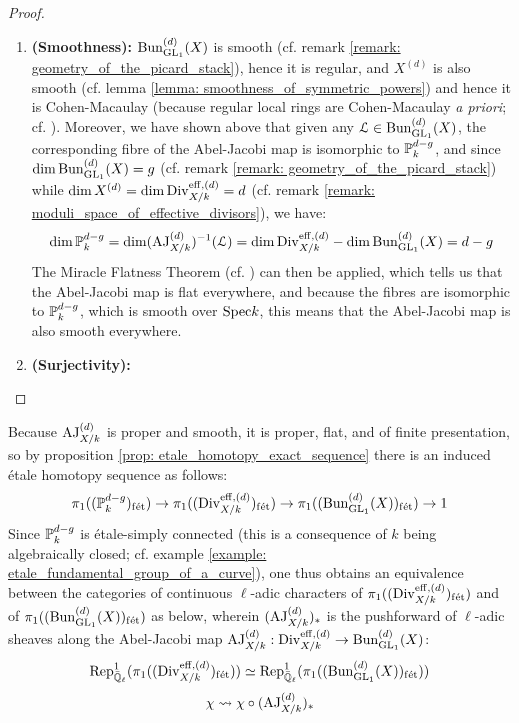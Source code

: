 \begin{proof}
\begin{enumerate}
                        \item \textbf{(Smoothness):} $\Bun_{\GL_1}^{(d)}(X)$ is smooth (cf. remark \ref{remark: geometry_of_the_picard_stack}), hence it is regular, and $X^{(d)}$ is also smooth (cf. lemma \ref{lemma: smoothness_of_symmetric_powers}) and hence it is Cohen-Macaulay (because regular local rings are Cohen-Macaulay \textit{a priori}; cf. \cite[\href{https://stacks.math.columbia.edu/tag/00NQ}{Tag 00NQ}]{stacks}). Moreover, we have shown above that given any $\calL \in \Bun_{\GL_1}^{(d)}(X)$, the corresponding fibre of the Abel-Jacobi map is isomorphic to $\P^{d - g}_k$, and since $\dim \Bun_{\GL_1}^{(d)}(X) = g$ (cf. remark \ref{remark: geometry_of_the_picard_stack}) while $\dim X^{(d)} = \dim \Div_{X/k}^{\eff, (d)} = d$ (cf. remark \ref{remark: moduli_space_of_effective_divisors}), we have:
                            $$\dim \P^{d - g}_k = \dim (\AJ_{X/k}^{(d)})^{-1}(\calL) = \dim \Div_{X/k}^{\eff, (d)} - \dim \Bun_{\GL_1}^{(d)}(X) = d - g$$
                        The Miracle Flatness Theorem (cf. \cite[\href{https://stacks.math.columbia.edu/tag/00R4}{Tag 00R4}]{stacks}) can then be applied, which tells us that the Abel-Jacobi map is flat everywhere, and because the fibres are isomorphic to $\P^{d - g}_k$, which is smooth over $\Spec k$, this means that the Abel-Jacobi map is also smooth everywhere.
                        \item \textbf{(Surjectivity):}
                    \end{enumerate}
            \end{proof}
        \begin{corollary} \label{coro: galois_representations_induced_by_the_abel_jacobi_map}
            Because $\AJ_{X/k}^{(d)}$ is proper and smooth, it is proper, flat, and of finite presentation, so by proposition \ref{prop: etale_homotopy_exact_sequence} there is an induced \'etale homotopy sequence as follows:
                $$\pi_1((\P^{d - g}_k)_{\fet}) \to \pi_1((\Div_{X/k}^{\eff, (d)})_{\fet}) \to \pi_1((\Bun_{\GL_1}^{(d)}(X))_{\fet}) \to 1$$
            Since $\P^{d - g}_k$ is \'etale-simply connected (this is a consequence of $k$ being algebraically closed; cf. example \ref{example: etale_fundamental_group_of_a_curve}), one thus obtains an equivalence between the categories of continuous $\ell$-adic characters of $\pi_1((\Div_{X/k}^{\eff, (d)})_{\fet})$ and of $\pi_1((\Bun_{\GL_1}^{(d)}(X))_{\fet})$ as below, wherein $(\AJ_{X/k}^{(d)})_*$ is the pushforward of $\ell$-adic sheaves along the Abel-Jacobi map $\AJ_{X/k}^{(d)}: \Div_{X/k}^{\eff, (d)} \to \Bun_{\GL_1}^{(d)}(X)$:
                $$\Rep^1_{\bar{\Q}_{\ell}}(\pi_1((\Div_{X/k}^{\eff, (d)})_{\fet})) \cong \Rep^1_{\bar{\Q}_{\ell}}(\pi_1((\Bun_{\GL_1}^{(d)}(X))_{\fet}))$$
                $$\chi \mapsto \chi \circ (\AJ_{X/k}^{(d)})_*$$
        \end{corollary}
    

